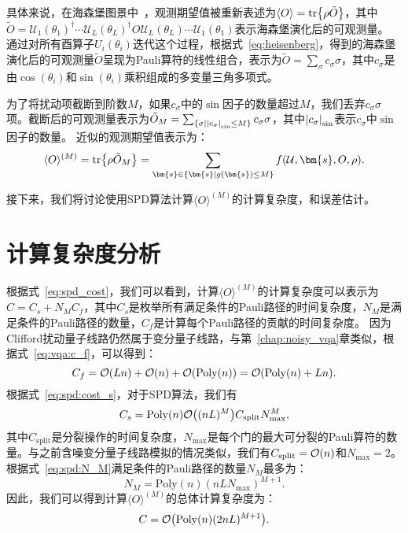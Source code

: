 具体来说，在海森堡图景中~\cite{zhang2024clifford}，观测期望值被重新表述为$\langle O \rangle = \tr{\rho \tilde{O}}$，其中$\tilde{O} = \mathcal{U}_1(\theta_1)^{\dagger} \cdots  \mathcal{U}_L(\theta_L)^{\dagger} O \mathcal{U}_L(\theta_L)  \cdots \mathcal{U}_1(\theta_1)$表示海森堡演化后的可观测量。
通过对所有酉算子$U_i(\theta_i)$迭代这个过程，根据式~\eqref{eq:heisenberg}，得到的海森堡演化后的可观测量$\tilde{O}$呈现为Pauli算符的线性组合，表示为$\tilde{O} = \sum_\sigma c_\sigma \sigma$，其中$c_\sigma$是由$\cos(\theta_i)$和$\sin(\theta_i)$乘积组成的多变量三角多项式。

为了将扰动项截断到阶数$M$，如果$c_\sigma$中的$\sin$因子的数量超过$M$，我们丢弃$c_\sigma \sigma$项。截断后的可观测量表示为$\tilde{O}_M=\sum_{\{\sigma\mid \abs{c_\sigma}_{\sin}\leq M\}} c_\sigma \sigma$，其中$\abs{c_\sigma}_{\sin}$表示$c_\sigma$中$\sin$因子的数量。
近似的观测期望值表示为：
\begin{equation}\label{eq:sim_noiseless}
  \langle O \rangle ^{(M)}= \tr{\rho \tilde{O}_M}= \sum_{\bm{s}\in \{\bm{s}\mid g(\bm{s})\leq M\}} f(\mathcal{U},\bm{s},O,\rho).
\end{equation}

接下来，我们将讨论使用SPD算法计算$\langle O \rangle ^{(M)}$的计算复杂度，和误差估计。

\section{计算复杂度分析}
根据式~\eqref{eq:spd_cost}，我们可以看到，计算$\langle O \rangle ^{(M)}$的计算复杂度可以表示为$C = C_s+N_MC_f$，其中$C_s$是枚举所有满足条件的Pauli路径的时间复杂度，$N_M$是满足条件的Pauli路径的数量，$C_f$是计算每个Pauli路径的贡献的时间复杂度。
因为Clifford扰动量子线路仍然属于变分量子线路，与第~\ref{chap:noisy_vqa}章类似，根据式~\eqref{eq:vqa:c_f}，可以得到：
\begin{equation}
    C_f=\order{L n}+\order{n}+\order{\poly(n)}=\order{\poly(n)+L n}.
\end{equation}
根据式~\eqref{eq:spd:cost_s}，对于SPD算法，我们有
\begin{equation}
    C_s=\mathrm{Poly}(n) \order{(nL)^{M}} C_{\text{split}} N_{\text{max}}^{M},
\end{equation}
其中$C_{\text{split}}$是分裂操作的时间复杂度，$N_{\text{max}}$是每个门的最大可分裂的Pauli算符的数量。与之前含噪变分量子线路模拟的情况类似，我们有$C_{\text{split}}=\order{n}$和$N_{\text{max}}=2$。
根据式~\eqref{eq:spd:N_M}满足条件的Pauli路径的数量$N_M$最多为：
\begin{equation}
    N_M=\mathrm{Poly}(n) (nLN_{\text{max}})^{M+1}.
\end{equation}
因此，我们可以得到计算$\langle O \rangle ^{(M)}$的总体计算复杂度为：
\begin{equation}
    C=\order{\mathrm{Poly}(n) (2nL)^{M+1}}.
\end{equation}

